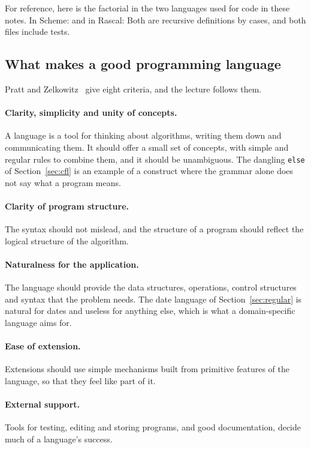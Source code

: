 For reference, here is the factorial in the two languages used for code in
these notes. In Scheme:
and in Rascal:
Both are recursive definitions by cases, and both files include tests.

\subsection{What makes a good programming language}

Pratt and Zelkowitz~\cite{pratt2001design} give eight criteria, and the
lecture follows them.

\paragraph{Clarity, simplicity and unity of concepts.} A language is a tool
for thinking about algorithms, writing them down and communicating them. It
should offer a small set of concepts, with simple and regular rules to combine
them, and it should be unambiguous. The dangling \texttt{else} of
Section~\ref{sec:cfl} is an example of a construct where the grammar alone
does not say what a program means.

\paragraph{Clarity of program structure.} The syntax should not mislead, and
the structure of a program should reflect the logical structure of the
algorithm.

\paragraph{Naturalness for the application.} The language should provide the
data structures, operations, control structures and syntax that the problem
needs. The date language of Section~\ref{sec:regular} is natural for dates and
useless for anything else, which is what a domain-specific language aims for.

\paragraph{Ease of extension.} Extensions should use simple mechanisms built
from primitive features of the language, so that they feel like part of it.

\paragraph{External support.} Tools for testing, editing and storing
programs, and good documentation, decide much of a language's success.

